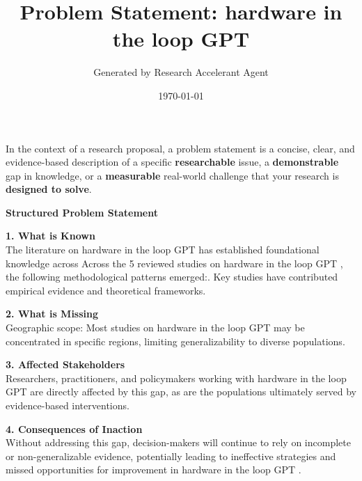 \documentclass[11pt,a4paper]{article}
\title{\textbf{Problem Statement: hardware in the loop GPT }}
\author{Generated by Research Accelerant Agent}
\date{\today}
\begin{document}
\maketitle



\begin{resultbox}[Definition]
In the context of a research proposal, a problem statement is a concise, clear, and evidence-based description of a specific \textbf{researchable} issue, a \textbf{demonstrable} gap in knowledge, or a \textbf{measurable} real-world challenge that your research is \textbf{designed to solve}.
\end{resultbox}

\vspace{1em}

\textbf{\large Structured Problem Statement}\par\vspace{0.5em}

\textbf{1. What is Known}\\
The literature on hardware in the loop GPT  has established foundational knowledge across Across the 5 reviewed studies on hardware in the loop GPT , the following methodological patterns emerged:. Key studies have contributed empirical evidence and theoretical frameworks.

\vspace{0.5em}

\textbf{2. What is Missing}\\
Geographic scope: Most studies on hardware in the loop GPT  may be concentrated in specific regions, limiting generalizability to diverse populations.

\vspace{0.5em}

\textbf{3. Affected Stakeholders}\\
Researchers, practitioners, and policymakers working with hardware in the loop GPT  are directly affected by this gap, as are the populations ultimately served by evidence-based interventions.

\vspace{0.5em}

\textbf{4. Consequences of Inaction}\\
Without addressing this gap, decision-makers will continue to rely on incomplete or non-generalizable evidence, potentially leading to ineffective strategies and missed opportunities for improvement in hardware in the loop GPT .

\vspace{0.5em}
\end{document}
